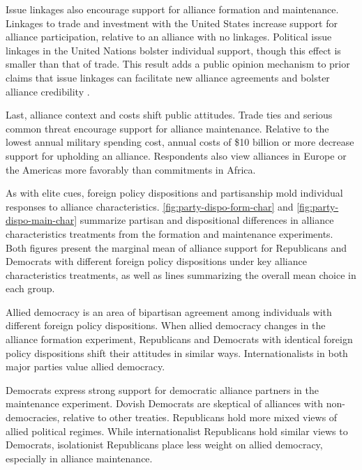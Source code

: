 \documentclass[12pt]{article}
\begin{document}
Issue linkages also encourage support for alliance formation and maintenance. 
Linkages to trade and investment with the United States increase support for alliance participation, relative to an alliance with no linkages. 
Political issue linkages in the United Nations bolster individual support, though this effect is smaller than that of trade. 
This result adds a public opinion mechanism to prior claims that issue linkages can facilitate new alliance agreements \citep{Poast2012} and bolster alliance credibility \citep{Poast2013}. 


Last, alliance context and costs shift public attitudes. 
Trade ties and serious common threat encourage support for alliance maintenance. 
Relative to the lowest annual military spending cost, annual costs of \$10 billion or more decrease support for upholding an alliance.  
Respondents also view alliances in Europe or the Americas more favorably than commitments in Africa. 



As with elite cues, foreign policy dispositions and partisanship mold individual responses to alliance characteristics. 
\autoref{fig:party-dispo-form-char} and \autoref{fig:party-dispo-main-char} summarize partisan and dispositional differences in alliance characteristics treatments from the formation and maintenance experiments. 
Both figures present the marginal mean of alliance support for Republicans and Democrats with different foreign policy dispositions under key alliance characteristics treatments, as well as lines summarizing the overall mean choice in each group. 


Allied democracy is an area of bipartisan agreement among individuals with different foreign policy dispositions.
When allied democracy changes in the alliance formation experiment, Republicans and Democrats with identical foreign policy dispositions shift their attitudes in similar ways. 
Internationalists in both major parties value allied democracy. 


Democrats express strong support for democratic alliance partners in the maintenance experiment. 
Dovish Democrats are skeptical of alliances with non-democracies, relative to other treaties. 
Republicans hold more mixed views of allied political regimes. 
While internationalist Republicans hold similar views to Democrats, isolationist Republicans place less weight on allied democracy, especially in alliance maintenance. 
\end{document}
